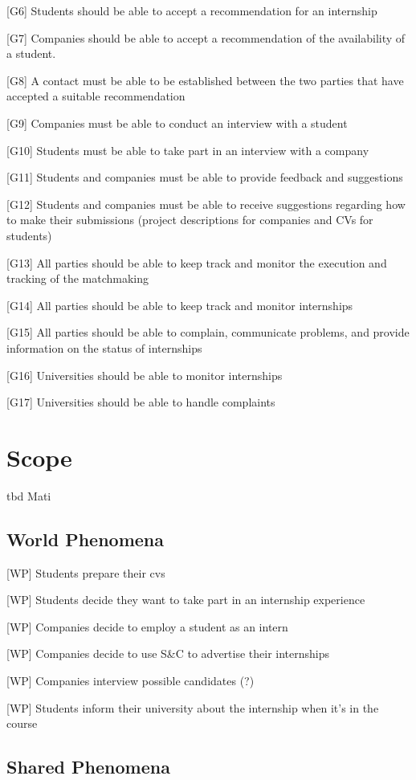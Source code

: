[G6] Students should be able to accept a recommendation for an internship  

[G7] Companies should be able to accept a recommendation of the availability of a student. 

[G8] A contact must be able to be established between the two parties that have accepted a suitable recommendation  


[G9] Companies must be able to conduct an interview with a student 


[G10] Students must be able to take part in an interview with a company

[G11] Students and companies must be able to provide feedback and suggestions

[G12] Students and companies must be able to receive suggestions regarding how to make their submissions (project descriptions for companies and CVs for students)

[G13] All parties should be able to keep track and monitor the execution and tracking of the matchmaking

[G14] All parties should be able to keep track and monitor internships

[G15] All parties should be able to complain, communicate problems, and provide information on the status of internships

[G16] Universities should be able to monitor internships

[G17] Universities should be able to handle complaints



\section{Scope}
tbd Mati
\subsection{World Phenomena}
[WP] Students prepare their cvs

[WP] Students decide they want to take part in an internship experience

[WP] Companies decide to employ a student as an intern

[WP] Companies decide to use S\&C to advertise their internships

[WP] Companies interview possible candidates (?)

[WP] Students inform their university about the internship when it's in the course


\subsection{Shared Phenomena}


